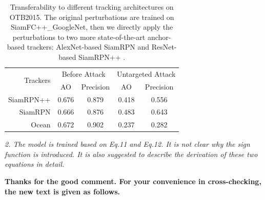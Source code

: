 \documentclass[12pt]{article}
\begin{document}
\begin{table}[t!]
  \centering
  \caption{Transferability to different tracking architectures on OTB2015. The original perturbations are trained on SiamFC++\_GoogleNet, then we directly apply the perturbations to two more state-of-the-art anchor-based trackers: AlexNet-based SiamRPN \cite{SiamRPN} and ResNet-based SiamRPN++ \cite{SiamRPN++}.}
  \begin{tabular}{rcccc} 
  \toprule
  \multirow{2}{*}[-2pt]{Trackers} & \multicolumn{2}{c}{Before Attack} & \multicolumn{2}{c}{Untargeted Attack}  \\
  \cmidrule{2-5}
                            & AO & Precision              & AO    & Precision \\ \midrule
  SiamRPN++                 & 0.676   & 0.879             & 0.418 & 0.556     \\
  SiamRPN                   & 0.666   & 0.876             & 0.483 & 0.643     \\
  Ocean                     & 0.672   & 0.902             & 0.237 & 0.282     \\ \bottomrule
  \end{tabular}
  \label{tab:arch}
\end{table}

\textit{2. The model is trained based on Eq.11 and Eq.12. It is not clear why the sign function is introduced. It is also suggested to describe the derivation of these two equations in detail.}

\textbf{Thanks for the good comment. For your convenience in cross-checking, the new text is given as follows.}
\end{document}
